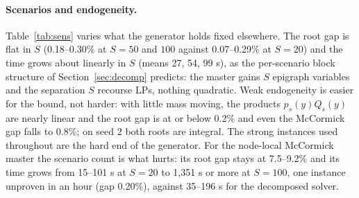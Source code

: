 \documentclass[11pt]{article}
\begin{document}
\paragraph{Scenarios and endogeneity.} Table~\ref{tab:sens} varies what the generator holds fixed elsewhere. The root
gap is flat in $S$ (0.18--0.30\% at $S = 50$ and $100$ against 0.07--0.29\% at $S = 20$) and the time grows about
linearly in $S$ (means 27, 54, 99 s), as the per-scenario block structure of Section~\ref{sec:decomp} predicts: the
master gains $S$ epigraph variables and the separation $S$ recourse LPs, nothing quadratic. Weak endogeneity is
easier for the bound, not harder: with little mass moving, the products $p_s(y)Q_s(y)$ are nearly linear and the
root gap is at or below 0.2\% and even the McCormick gap falls to 0.8\%; on seed 2 both roots are integral. The
strong instances used throughout are the hard end of the generator. For the node-local McCormick master the
scenario count is what hurts: its root gap stays at 7.5--9.2\% and its time grows from 15--101 s at $S = 20$ to
1,351 s or more at $S = 100$, one instance unproven in an hour (gap 0.20\%), against 35--196 s for the decomposed
solver.
\end{document}

